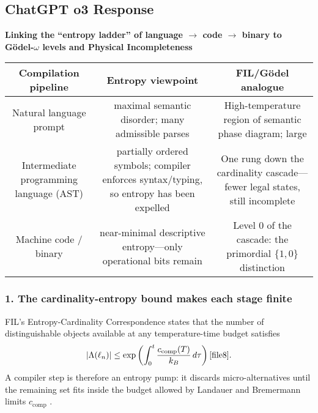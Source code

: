 \documentclass[11pt,letterpaper]{article}
\begin{document}
\subsection{ChatGPT o3 Response}
\label{subsec:q2_chatgpt}

\textbf{Linking the “entropy ladder” of language $\to$ code $\to$ binary to Gödel-$\omega$ levels and Physical Incompleteness}

\begin{center}
\begin{tabular}{ccc}
\toprule
\textbf{Compilation pipeline} & \textbf{Entropy viewpoint} & \textbf{FIL/Gödel analogue} \\
\midrule
Natural language prompt & maximal semantic disorder; many admissible parses & High-temperature region of semantic phase diagram; large \\
Intermediate programming language (AST) & partially ordered symbols; compiler enforces syntax/typing, so entropy has been expelled & One rung down the cardinality cascade—fewer legal states, still incomplete \\
Machine code / binary & near-minimal descriptive entropy—only operational bits remain & Level 0 of the cascade: the primordial $\{1,0\}$ distinction \cite[§L51-L55]{file4} \\
\bottomrule
\end{tabular}
\end{center}

\subsubsection*{1. The cardinality-entropy bound makes each stage finite}
FIL’s Entropy-Cardinality Correspondence states that the number of distinguishable objects available at any temperature-time budget satisfies
\[
|\Lambda(\ell_n)| \leq \exp\left( \int_0^t \frac{c_{\text{comp}}(T)}{k_B} \, d\tau \right) \cite[§L25-L29]{file8}.
\]
A compiler step is therefore an entropy pump: it discards micro-alternatives until the remaining set fits inside the budget allowed by Landauer and Bremermann limits $c_{\text{comp}}$ \cite[§L8-L13]{file8}.
\end{document}
